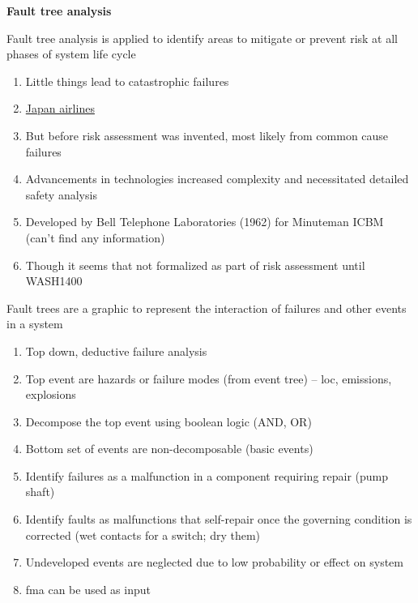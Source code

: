 \documentclass[aspectratio=1610,pdftex,dvipsnames,compress,xcolor={dvipsnames}]{beamer}
\newcommand{\acs}{\acrshort} %
\begin{document}
\begin{frame}[plain]{}
    \centering\LARGE\textbf{Fault tree analysis}
\end{frame}


\addtocounter{framenumber}{-1}
\begin{frame}{Fault tree analysis is applied to identify areas to mitigate or prevent risk at all phases of system life cycle}
    \begin{enumerate}[series=outerlist,topsep=0pt,itemsep=13pt,leftmargin=*,label=(\arabic*)]
        \item[]Little things lead to catastrophic failures
        \item[]\href{https://www.faa.gov/lessons_learned/transport_airplane/accidents/JA8119}{Japan airlines}
        \item[]But before risk assessment was invented, most likely from common cause failures
        \item[]Advancements in technologies increased complexity and necessitated detailed safety analysis
        \item[]Developed by Bell Telephone Laboratories (1962) for Minuteman ICBM (can't find any information)
        \item[]Though it seems that not formalized as part of risk assessment until WASH1400
    \end{enumerate}
\end{frame}


\begin{frame}{Fault trees are a graphic to represent the interaction of failures and other events in a system}
    \begin{enumerate}[series=outerlist,topsep=0pt,itemsep=11pt,leftmargin=*,label=(\arabic*)]
        \item[]Top down, deductive failure analysis  
        \item[]Top event are hazards or failure modes (from event tree) -- \acs{loc}, emissions, explosions
        \item[]Decompose the top event using boolean logic (AND, OR)
        \item[]Bottom set of events are non-decomposable (basic events)
        \item[]Identify failures as a malfunction in a component requiring repair (pump shaft)
        \item[]Identify faults as malfunctions that self-repair once the governing condition is corrected (wet contacts for a switch; dry them)
        \item[]Undeveloped events are neglected due to low probability or effect on system
        \item[]\acs{fma} can be used as input
    \end{enumerate}
\end{frame}
\end{document}
